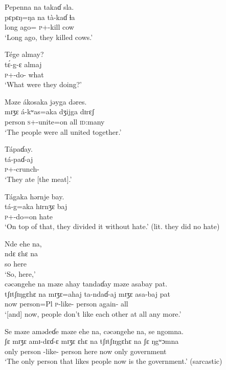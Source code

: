 \ea Pepenna  na  takaɗ  sla.\\
 \gll pɛpɛŋ=ŋa   na  tà-kaɗ ɬa \\
{long ago}={\ADV}  {\PSP}  \textsc{p}+{\PFV}-kill  cow  \\
 \glt ‘Long ago, they killed cows.’
 \z

\ea Tége  almay?\\
 \gll t\'ɛ-g-ɛ     almaj\\
 \textsc{p}+{\IFV}{}-do-{\CL}  what\\
 \glt ‘What were they doing?’
 \z

\ea Məze  ákosaka  jəyga  dəres. \\
\gll mɪʒɛ   á-kʷas=aka   dʒijga   dɪrɛʃ\\
 person  \textsc{s}+{\IFV}-unite=on  all  \textsc{id}:many\\
 \glt ‘The people were all united together.’
\z

\ea  Tápaɗay.\\ 
 \gll tá-paɗ-aj \\
 \textsc{p}+{\IFV}-crunch{}-{\CL}\\
 \glt ‘They ate [the meat].’
 \z

\ea Tágaka  hərnje  bay.\\
 \gll tá-g=aka   hɪrnʒɛ   baj\\
 \textsc{p}+{\IFV}-do=on  hate  {\NEG}\\
 \glt ‘On top of that, they divided it without hate.’ (lit. they did no hate)
 \z

\ea Nde  ehe  na,   \\
 \gll ndɛ   ɛhɛ      na \\
 so  here   {\PSP}     \\
 \glt ‘So, here,’\\
 
 \medskip
 cəcəngehe  na  məze  ahay  tandaɗay  məze  asabay  pat.\\
 \gll tʃɪtʃɪŋgɛhɛ  na   mɪʒɛ=ahaj   ta-ndaɗ-aj     mɪʒɛ  asa-baj     pat\\
 now           {\PSP}  person=Pl  \textsc{p}-like-{\CL}    person  again-{\NEG}  all\\
 \glt ‘[and] now, people don’t like each other at all any more.’
 \z

\ea Se  məze  amədeɗe  məze  ehe  na, cəcəngehe  na,  se  ngomna.   \\
 \gll ʃɛ    mɪʒɛ     amɪ-dɛɗ-ɛ  mɪʒɛ  ɛhɛ     na tʃɪtʃɪŋgɛhɛ  na   ʃɛ   ŋgʷɔmna\\
 only    person  {\DEP}-like-{\CL}  person  here  {\PSP}  now    {\PSP}  only  government \\
 \glt ‘The only person that likes people now is the government.’ (sarcastic)\\
 \z
 
